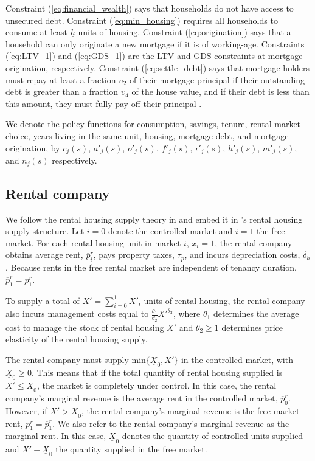 \documentclass[parskip=full]{article}
\begin{document}
Constraint (\ref{eq:financial_wealth}) says that households do not have access to unsecured debt. Constraint (\ref{eq:min_housing}) requires all households to consume at least $\underline{h}$ units of housing. Constraint (\ref{eq:origination}) says that a household can only originate a new mortgage if it is of working-age. Constraints (\ref{eq:LTV_1}) and (\ref{eq:GDS_1}) are the LTV and GDS constraints at mortgage origination, respectively. Constraint (\ref{eq:settle_debt}) says that mortgage holders must repay at least a fraction $\upsilon_{2}$ of their mortgage principal if their outstanding debt is greater than a fraction $\upsilon_{4}$ of the house value, and if their debt is less than this amount, they must fully pay off their principal .

We denote the policy functions for consumption, savings, tenure, rental market choice, years living in the same unit, housing, mortgage debt, and mortgage origination, by $c_{j}(s)$, $a'_{j}(s)$, $o'_{j}(s)$, $f'_{j}(s)$, $\iota'_{j}(s)$, $h'_{j}(s)$, $m'_{j}(s)$, and $n_{j}(s)$ respectively.

\subsection{Rental company}\label{sec:rental_company}

We follow the rental housing supply theory in \citet{fallis-1985} and embed it in \citet{garrigaeetal-2009}'s rental housing supply structure. Let $i=0$ denote the controlled market and $i=1$ the free market. For each rental housing unit in market $i$, $x_{i}=1$, the rental company obtains average rent, $\overline{p}^{r}_{i}$, pays property taxes, $\tau_{p}$, and incurs depreciation costs, $\delta_{h}$. Because rents in the free rental market are independent of tenancy duration, $\overline{p}^{r}_{1}=p^{r}_{1}$. 

To supply a total of $X'=\sum^{1}_{i=0} X'_{i}$ units of rental housing, the rental company also incurs management costs equal to $\frac{\theta_{1}}{\theta_{2}}X'^{\theta_{2}}$, where $\theta_{1}$ determines the average cost to manage the stock of rental housing $X'$ and $\theta_{2}\geq 1$ determines price elasticity of the rental housing supply. 

The rental company must supply $\mbox{min}\{\underline{X}_{0},X'\}$ in the controlled market, with $\underline{X}_{0} \geq 0$. This means that if the total quantity of rental housing supplied is $X'\leq \underline{X}_{0}$, the market is completely under control. In this case, the rental company's marginal revenue is the average rent in the controlled market, $\overline{p}^{r}_{0}$. However, if $X'>\underline{X}_{0}$, the rental company's marginal revenue is the free market rent, $p^{r}_{1}=\overline{p}^{r}_{1}$. We also refer to the rental company's marginal revenue as the marginal rent. In this case, $\underline{X}_{0}$ denotes the quantity of controlled units supplied and $X'-\underline{X}_{0}$ the quantity supplied in the free market.
\end{document}
